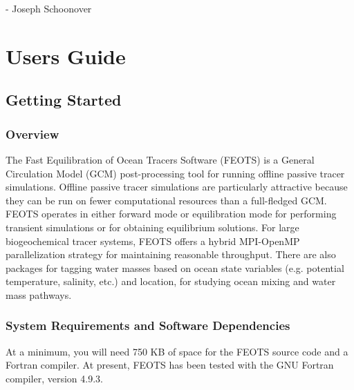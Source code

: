 \documentclass{softwaremanual}
\begin{document}
 \begin{flushright}
 - Joseph Schoonover
 \end{flushright}

\pagebreak

{\selectfont
\tableofcontents*
}
\mainmatter

\pagestyle{myheadings}
\part{Users Guide}
\chapter{Getting Started}
\section{Overview}
 The Fast Equilibration of Ocean Tracers Software (FEOTS) is a General Circulation Model (GCM) post-processing tool for running offline passive tracer simulations. Offline passive tracer simulations are particularly attractive because they can be run on fewer computational resources than a full-fledged GCM. FEOTS operates in either forward mode or equilibration mode for performing transient simulations or for obtaining equilibrium solutions.  For large biogeochemical tracer systems, FEOTS offers a hybrid MPI-OpenMP parallelization strategy for maintaining reasonable throughput. There are also packages for tagging water masses based on ocean state variables (e.g. potential temperature, salinity, etc.) and location, for studying ocean mixing and water mass pathways.
 
 
\section{System Requirements and Software Dependencies}
At a minimum, you will need 750 KB of space for the FEOTS source code and a Fortran compiler. At present, FEOTS has been tested with the GNU Fortran compiler, version 4.9.3.
\end{document}
